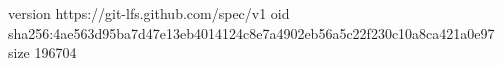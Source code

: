version https://git-lfs.github.com/spec/v1
oid sha256:4ae563d95ba7d47e13eb4014124c8e7a4902eb56a5c22f230c10a8ca421a0e97
size 196704
